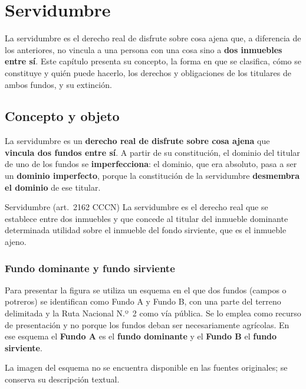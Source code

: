 \documentclass[12pt,oneside]{book}
\begin{document}
\chapter{Servidumbre}\label{cap:servidumbre}

La servidumbre es el derecho real de disfrute sobre cosa ajena que, a diferencia de los anteriores, no vincula a una persona con una cosa sino a \textbf{dos inmuebles entre sí}. Este capítulo presenta su concepto, la forma en que se clasifica, cómo se constituye y quién puede hacerlo, los derechos y obligaciones de los titulares de ambos fundos, y su extinción.

\section{Concepto y objeto}

La servidumbre es un \textbf{derecho real de disfrute sobre cosa ajena} que \textbf{vincula dos fundos entre sí}. A partir de su constitución, el dominio del titular de uno de los fundos se \textbf{imperfecciona}: el dominio, que era absoluto, pasa a ser un \textbf{dominio imperfecto}, porque la constitución de la servidumbre \textbf{desmembra el dominio} de ese titular.

\begin{definicion}{Servidumbre (art.~2162 CCCN)}
La servidumbre es el derecho real que se establece entre dos inmuebles y que concede al titular del inmueble dominante determinada utilidad sobre el inmueble del fondo sirviente, que es el inmueble ajeno.
\end{definicion}

\subsection{Fundo dominante y fundo sirviente}

Para presentar la figura se utiliza un esquema en el que dos fundos (campos o potreros) se identifican como Fundo A y Fundo B, con una parte del terreno delimitada y la Ruta Nacional N.º~2 como vía pública. Se lo emplea como recurso de presentación y no porque los fundos deban ser necesariamente agrícolas. En ese esquema el \textbf{Fundo A} es el \textbf{fundo dominante} y el \textbf{Fundo B} el \textbf{fundo sirviente}.

\begin{nota}
La imagen del esquema no se encuentra disponible en las fuentes originales; se conserva su descripción textual.
\end{nota}
\end{document}
